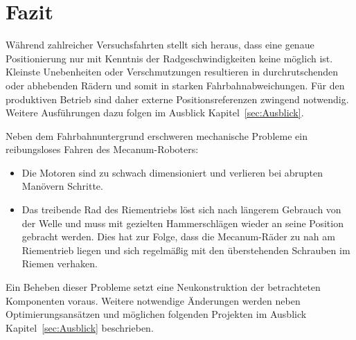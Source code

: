 
\section{Fazit}
\label{sec:Fazit}

Während zahlreicher Versuchsfahrten stellt sich heraus, dass eine  genaue Positionierung nur mit Kenntnis der Radgeschwindigkeiten keine möglich ist. Kleinste Unebenheiten oder Verschmutzungen resultieren in durchrutschenden oder abhebenden Rädern und somit in starken Fahrbahnabweichungen. Für den produktiven Betrieb sind daher externe Positionsreferenzen zwingend notwendig. Weitere Ausführungen dazu folgen im Ausblick Kapitel~\ref{sec:Ausblick}.

Neben dem Fahrbahnuntergrund erschweren mechanische Probleme ein reibungsloses Fahren des Mecanum-Roboters: 

\begin{itemize}
    \item{Die Motoren sind zu schwach dimensioniert und verlieren bei abrupten Manövern Schritte.}
    \item{Das treibende Rad des Riementriebs löst sich nach längerem Gebrauch von der Welle und muss mit gezielten Hammerschlägen wieder an seine Position gebracht werden. Dies hat zur Folge, dass die Mecanum-Räder zu nah am Riementrieb liegen und sich regelmäßig mit den überstehenden Schrauben im Riemen verhaken.}
\end{itemize}

Ein Beheben dieser Probleme setzt eine Neukonstruktion der betrachteten Komponenten voraus. Weitere notwendige Änderungen werden neben Optimierungsansätzen und möglichen folgenden Projekten im Ausblick Kapitel~\ref{sec:Ausblick} beschrieben.
